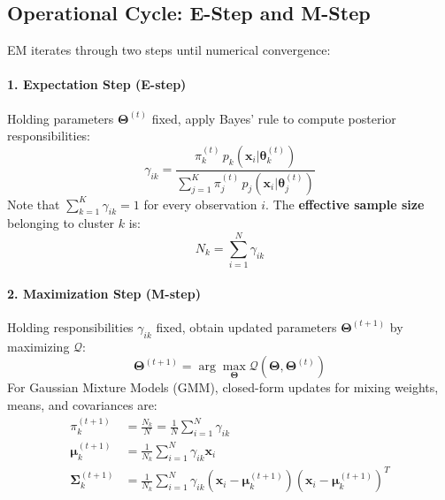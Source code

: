 \subsection{Operational Cycle: E-Step and M-Step}

EM iterates through two steps until numerical convergence:

\paragraph{1. Expectation Step (E-step)}
Holding parameters $\boldsymbol{\Theta}^{(t)}$ fixed, apply Bayes' rule to compute posterior responsibilities:
\begin{equation}
\label{eq:dm-e-step}
\gamma_{ik} = \frac{\pi_k^{(t)} \, p_k(\mathbf{x}_i | \boldsymbol{\theta}_k^{(t)})}{\sum_{j=1}^K \pi_j^{(t)} \, p_j(\mathbf{x}_i | \boldsymbol{\theta}_j^{(t)})}
\end{equation}
Note that $\sum_{k=1}^K \gamma_{ik} = 1$ for every observation $i$. The \textbf{effective sample size} belonging to cluster $k$ is:
\begin{equation}
\label{eq:dm-effective-nk}
N_k = \sum_{i=1}^N \gamma_{ik}
\end{equation}

\paragraph{2. Maximization Step (M-step)}
Holding responsibilities $\gamma_{ik}$ fixed, obtain updated parameters $\boldsymbol{\Theta}^{(t+1)}$ by maximizing $\mathcal{Q}$:
\begin{equation}
\label{eq:dm-m-step-argmax}
\boldsymbol{\Theta}^{(t+1)} = \arg\max_{\boldsymbol{\Theta}} \mathcal{Q}(\boldsymbol{\Theta}, \boldsymbol{\Theta}^{(t)})
\end{equation}
For Gaussian Mixture Models (GMM), closed-form updates for mixing weights, means, and covariances are:
\begin{align}
\label{eq:dm-m-step-pi}
\pi_k^{(t+1)} &= \frac{N_k}{N} = \frac{1}{N} \sum_{i=1}^N \gamma_{ik} \\
\label{eq:dm-m-step-mu}
\boldsymbol{\mu}_k^{(t+1)} &= \frac{1}{N_k} \sum_{i=1}^N \gamma_{ik} \mathbf{x}_i \\
\label{eq:dm-m-step-sigma}
\boldsymbol{\Sigma}_k^{(t+1)} &= \frac{1}{N_k} \sum_{i=1}^N \gamma_{ik} (\mathbf{x}_i - \boldsymbol{\mu}_k^{(t+1)}) (\mathbf{x}_i - \boldsymbol{\mu}_k^{(t+1)})^T
\end{align}

